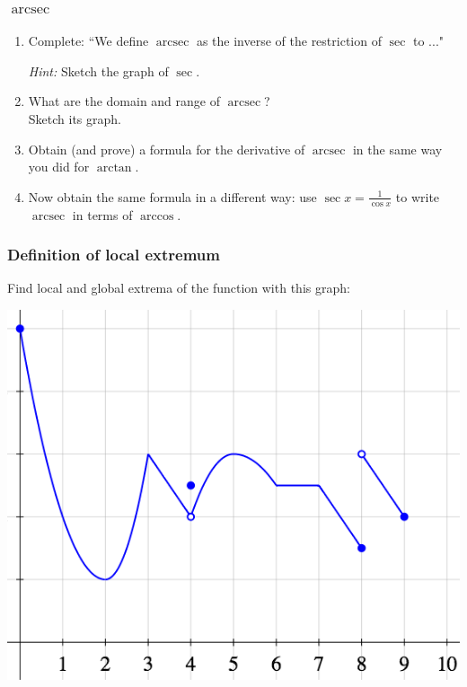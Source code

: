\documentclass[14pt]{beamer}
\begin{document}
\begin{frame}[t]
	\frametitle{$\operatorname{arcsec}$}

	\begin{enumerate}
		\item Complete: ``We define $\operatorname{arcsec}$ as the inverse of the
			restriction of $\sec$ to ..."

			\emph{Hint:} Sketch the graph of $\sec$.

			\vfill

		\item What are the domain and range of $\operatorname{arcsec}$? \\ Sketch
			its graph.

			\vfill

		\item Obtain (and prove) a formula for the derivative of $\operatorname{arcsec}$
			in the same way you did for $\arctan$.

			\vfill

		\item Now obtain the same formula in a different way: use
			$\displaystyle \sec x = \frac{1}{\cos x}$ to write
			$\displaystyle \operatorname{arcsec}$ in terms of $\displaystyle \arccos$.
	\end{enumerate}
\end{frame}

\begin{frame}
	\frametitle{Definition of local extremum}

	Find local and global extrema of the function with this graph:

	\begin{center}
		\includegraphics[scale=.42]{G13}
	\end{center}
\end{frame}
\end{document}
